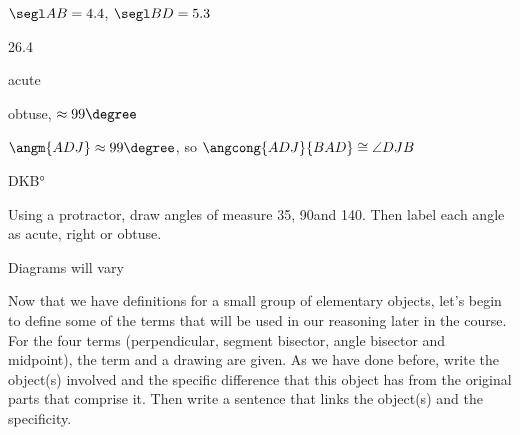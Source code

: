 \begin{exercises}
\begin{ex}

	\begin{sol}
	\begin{exparts}
	\item $\segl AB=4.4$, $\segl BD=5.3$
	\item 26.4\degree
	\item acute
	\item obtuse, $\approx 99\degree$
	\item $\angm {ADJ}\approx 99\degree$, so $\angcong{ADJ}{BAD}\cong \angle DJB$
	\item \ang {DKB}
	\end{exparts}
	\end{sol}
	\end{ex}
	
		\begin{ex}
	\e Using a protractor, draw angles of measure 35\degree, 90\degree and 140\degree. Then label each angle as acute, right or obtuse.
	\begin{sol}
	Diagrams will vary
	\end{sol}
	\end{ex}
	
	\bigskip
	
	\begin{ex}
	\e Now that we have definitions for a small group of elementary objects, let's begin to define some of the terms that will be used in our reasoning later in the course.  For the four terms (perpendicular, segment bisector, angle bisector and midpoint), the term and a drawing are given.  As we have done before, write the object(s) involved and the specific difference that this object has from the original parts that comprise it.  Then write a sentence that links the object(s) and the specificity.\\
	

\end{ex}
\end{exercises}
